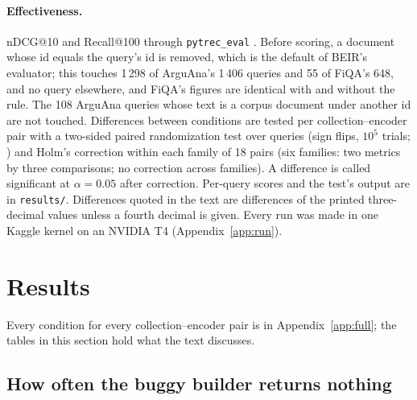 \documentclass[11pt]{article}
\begin{document}
\paragraph{Effectiveness.} nDCG@10 and Recall@100 through \texttt{pytrec\_eval} \citep{vangysel2018pytrec}. Before scoring, a document whose id equals the query's id is removed, which is the default of BEIR's evaluator; this touches 1\,298 of ArguAna's 1\,406 queries and 55 of FiQA's 648, and no query elsewhere, and FiQA's figures are identical with and without the rule. The 108 ArguAna queries whose text is a corpus document under another id are not touched. Differences between conditions are tested per collection--encoder pair with a two-sided paired randomization test over queries (sign flips, $10^5$ trials; \citealp{smucker2007comparison}) and Holm's correction within each family of 18 pairs (six families: two metrics by three comparisons; no correction across families). A difference is called significant at $\alpha = 0.05$ after correction. Per-query scores and the test's output are in \texttt{results/}. Differences quoted in the text are differences of the printed three-decimal values unless a fourth decimal is given. Every run was made in one Kaggle kernel on an NVIDIA T4 (Appendix~\ref{app:run}).

\section{Results}
\label{sec:results}

Every condition for every collection--encoder pair is in Appendix~\ref{app:full}; the tables in this section hold what the text discusses.

\subsection{How often the buggy builder returns nothing}
\label{sec:leg}
\end{document}
